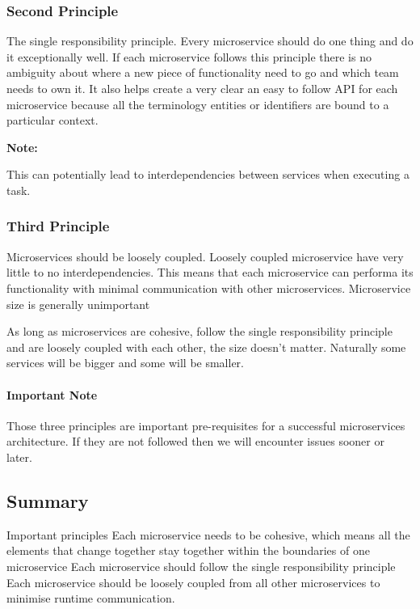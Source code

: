 \documentclass[a4paper, 11pt]{book}
\newenvironment{note}{
    \begin{siderule}
        \textbf{Note: }
        }{
    \end{siderule}}
\begin{document}
    \subsubsection{Second Principle}
    The single responsibility principle.
    Every microservice should do one thing and do it exceptionally well.
    If each microservice follows this principle there is no ambiguity about where a new piece of functionality need to go and which team needs to own it.
    It also helps create a very clear an easy to follow API for each microservice because all the terminology entities or identifiers are bound to a particular context.

    \begin{note}
    This can potentially lead to interdependencies between services when executing a task.
    \end{note}

    \subsubsection{Third Principle}
    Microservices should be loosely coupled.
    Loosely coupled microservice have very little to no interdependencies.
    This means that each microservice can performa its functionality with minimal communication with other microservices.
    Microservice size is generally unimportant

    As long as microservices are cohesive, follow the single responsibility principle and are loosely coupled with each other, the size doesn't matter.
    Naturally some services will be bigger and some will be smaller.

    \paragraph{Important Note}
    Those three principles are important pre-requisites for a successful microservices architecture.
    If they are not followed then we will encounter issues sooner or later.

    \subsection{Summary}
    Important principles
    Each microservice needs to be cohesive, which means all the elements that change together stay together within the boundaries of one microservice
    Each microservice should follow the single responsibility principle
    Each microservice should be loosely coupled from all other microservices to minimise runtime communication.
\end{document}
